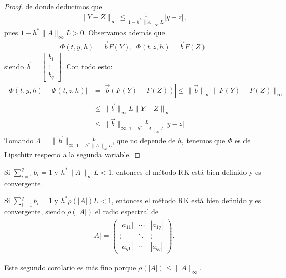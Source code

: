 \begin{proof}
de donde deducimos que
\begin{align*}
    \|Y-Z\|_{\infty} \leq \frac{1}{1 - h^*\|A\|_{\infty}L}|y-z|,
\end{align*}
pues $1 - h^*\|A\|_{\infty}L > 0$. Observamos además que
\begin{align*}
    \Phi(t,y,h) = \overrightarrow{b}F(Y), \ \ \Phi(t,z,h) = \overrightarrow{b}F(Z)
\end{align*}
siendo $\overrightarrow{b} = \begin{bmatrix}
b_1\\
\vdots \\
b_q
\end{bmatrix}$. Con todo esto:
\begin{align*}
    |\Phi(t,y,h) - \Phi(t,z,h)| &= |\overrightarrow{b}(F(Y) - F(Z))| \leq \|\overrightarrow{b}\|_{\infty}\|F(Y) - F(Z)\|_{\infty} \\
    & \leq \|\overrightarrow{b}\|_{\infty}L\|Y-Z\|_{\infty} \\
    & \leq \|\overrightarrow{b}\|_{\infty} \frac{L}{1 - h^*\|A\|_{\infty}L}|y-z|
\end{align*}
Tomando $\Lambda = \|\overrightarrow{b}\|_{\infty} \frac{L}{1 - h^*\|A\|_{\infty}L}$, que no depende de $h$, tenemos que $\Phi$ es de Lipschitz respecto a la segunda variable.
\end{proof}

\begin{cor}
Si $\sum_{i=1}^{q} b_i = 1$ y $h^* \|A\|_{\infty}L < 1$, entonces el método RK está bien definido y es convergente.
\end{cor}

\begin{cor}
Si $\sum_{i=1}^{q} b_i = 1$ y $h^* \rho(|A|)L < 1$, entonces el método RK está bien definido y es convergente, siendo $\rho(|A|)$ el radio espectral de
\begin{align*}
    |A| = \begin{pmatrix}
    |a_{11}| & \cdots & |a_{1q}|\\
    \vdots & \ddots & \vdots\\
    |a_{q1}| & \cdots & |a_{qq}|
\end{pmatrix}.
\end{align*}
\end{cor}

\begin{obs}
Este segundo corolario es más fino porque $\rho(|A|) \leq \|A\|_{\infty}$.
\end{obs}

